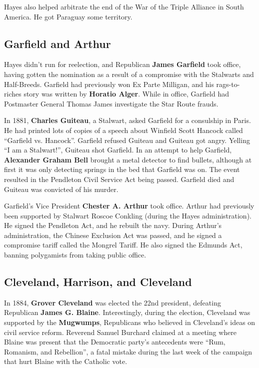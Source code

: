 Hayes also helped arbitrate the end of the War of the Triple Alliance in South America.
He got Paraguay some territory.

\subsection*{Garfield and Arthur}

Hayes didn't run for reelection, and Republican \textbf{James Garfield} took office,
having gotten the nomination as a result of a compromise with the Stalwarts and Half-Breeds.
Garfield had previously won Ex Parte Milligan,
and his rags-to-riches story was written by \textbf{Horatio Alger}.
While in office, Garfield had Postmaster General Thomas James investigate the Star Route frauds.

In 1881, \textbf{Charles Guiteau}, a Stalwart, asked Garfield for a consulship in Paris.
He had printed lots of copies of a speech about Winfield Scott Hancock called ``Garfield vs. Hancock''.
Garfield refused Guiteau and Guiteau got angry.
Yelling ``I am a Stalwart!'', Guiteau shot Garfield.
In an attempt to help Garfield, \textbf{Alexander Graham Bell} brought a metal detector to find bullets,
although at first it was only detecting springs in the bed that Garfield was on.
The event resulted in the Pendleton Civil Service Act being passed.
Garfield died and Guiteau was convicted of his murder.

Garfield's Vice President \textbf{Chester A. Arthur} took office.
Arthur had previously been supported by Stalwart Roscoe Conkling (during the Hayes administration).
He signed the Pendleton Act, and he rebuilt the navy.
During Arthur's administration, the Chinese Exclusion Act was passed,
and he signed a compromise tariff called the Mongrel Tariff.
He also signed the Edmunds Act, banning polygamists from taking public office.

\subsection*{Cleveland, Harrison, and Cleveland}

In 1884, \textbf{Grover Cleveland} was elected the 22nd president,
defeating Republican \textbf{James G. Blaine}.
Interestingly, during the election, Cleveland was supported by the \textbf{Mugwumps},
Republicans who believed in Cleveland's ideas on civil service reform.
Reverend Samuel Burchard claimed at a meeting where Blaine was present that
the Democratic party's antecedents were ``Rum, Romanism, and Rebellion'',
a fatal mistake during the last week of the campaign that hurt Blaine with the Catholic vote.

